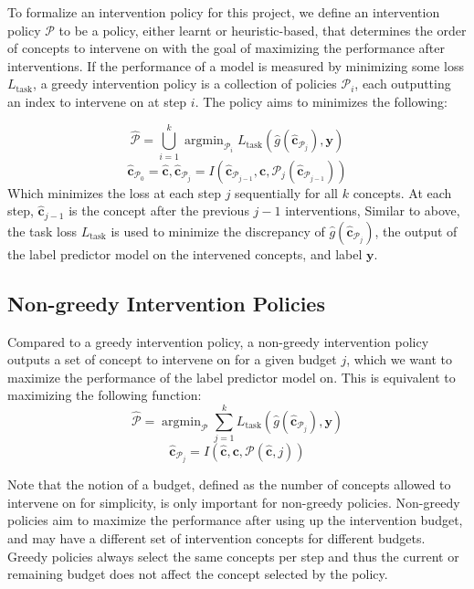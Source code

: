 \documentclass[../main.tex]{subfiles}
\begin{document}
To formalize an intervention policy for this
project, we define an intervention policy $\mathcal{P}$ to be a policy, either learnt
or heuristic-based, that determines the order of concepts to intervene 
on with the goal of maximizing the performance after interventions.
If the performance of a model is measured by minimizing some loss $L_{\text{task}}$,
a greedy intervention policy is a collection of policies $\mathcal{P}_i$, each
outputting an index to intervene on at step $i$. The policy aims to minimizes 
the following:

\[\hat{\mathcal{P}} = \bigcup_{i=1}^k \mathop{\mathrm{argmin}}_{\mathcal{P}_i} L_{\text{task}}(\hat{g}(\hat{\mathbf{c}}_{\mathcal{P}_j}), \mathbf{y}) \]
\[\hat{\mathbf{c}}_{\mathcal{P}_0} = \hat{\mathbf{c}}, \hat{\mathbf{c}}_{\mathcal{P}_j} = I(\hat{\mathbf{c}}_{\mathcal{P}_{j-1}}, \mathbf{c}, \mathcal{P}_j(\hat{\mathbf{c}}_{\mathcal{P}_{j-1}}))\]
Which minimizes the loss at each step $j$ sequentially
for all $k$ concepts. At each
step, $\hat{\mathbf{c}}_{j-1}$ is 
the concept after the previous $j-1$ interventions,
Similar to above, the task loss $L_{\text{task}}$ is used to minimize
the discrepancy of $\hat{g}(\hat{\mathbf{c}}_{\mathcal{P}_j})$, 
the output of the label predictor model on the intervened concepts,
and label $\mathbf{y}$.

\subsection{Non-greedy Intervention Policies}


Compared to a greedy intervention policy, a non-greedy intervention 
policy outputs a set of concept to intervene on for a given budget $j$,
which we want to maximize the performance of the 
label predictor model on. This is equivalent to maximizing the following 
function:
\[\hat{\mathcal{P}} = \mathop{\mathrm{argmin}}_{\mathcal{P}} \sum_{j=1}^k L_{\text{task}}(\hat{g}(\hat{\mathbf{c}}_{\mathcal{P}_j}), \mathbf{y}) \]
\[\hat{\mathbf{c}}_{\mathcal{P}_j} = I(\hat{\mathbf{c}}, \mathbf{c}, \mathcal{P}(\hat{\mathbf{c}}, j))\]

Note that the notion of a budget, defined as the number
of concepts allowed to intervene on for simplicity, is only
important for non-greedy policies. Non-greedy policies aim
to maximize the performance after using up the intervention budget,
and may have a different set of intervention concepts 
for different budgets. Greedy policies always select the same
concepts per step and thus the current or remaining budget does not 
affect the concept selected by the policy.
\end{document}
